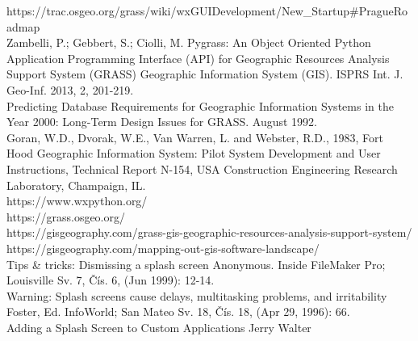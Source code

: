 \documentclass[a4paper,10pt,twoside]{article}
\begin{document}
\newpage
\vspace*{-6ex}
\renewcommand{\refname}{Bibliography} 
	
	

\noindent
\large

https://trac.osgeo.org/grass/wiki/wxGUIDevelopment/New\_Startup\#PragueRoadmap \\

Zambelli, P.; Gebbert, S.; Ciolli, M. Pygrass: An Object Oriented Python Application Programming Interface (API) for Geographic Resources Analysis Support System (GRASS) Geographic Information System (GIS). ISPRS Int. J. Geo-Inf. 2013, 2, 201-219. \\

Predicting Database Requirements for Geographic Information Systems in the Year 2000: Long-Term Design Issues for GRASS. August 1992.\\

Goran, W.D., Dvorak, W.E., Van Warren, L. and Webster, R.D., 1983, Fort Hood Geographic Information System: Pilot System Development and User Instructions, Technical Report N-154, USA Construction Engineering Research Laboratory, Champaign, IL.\\

https://www.wxpython.org/\\

https://grass.osgeo.org/\\

https://gisgeography.com/grass-gis-geographic-resources-analysis-support-system/\\

https://gisgeography.com/mapping-out-gis-software-landscape/\\

Tips \& tricks: Dismissing a splash screen Anonymous. Inside FileMaker Pro; Louisville Sv. 7, Čís. 6,  (Jun 1999): 12-14. \\

Warning: Splash screens cause delays, multitasking problems, and irritability Foster, Ed. InfoWorld; San Mateo Sv. 18, Čís. 18,  (Apr 29, 1996): 66. \\

Adding a Splash Screen to Custom Applications Jerry Walter \\
\end{document}
